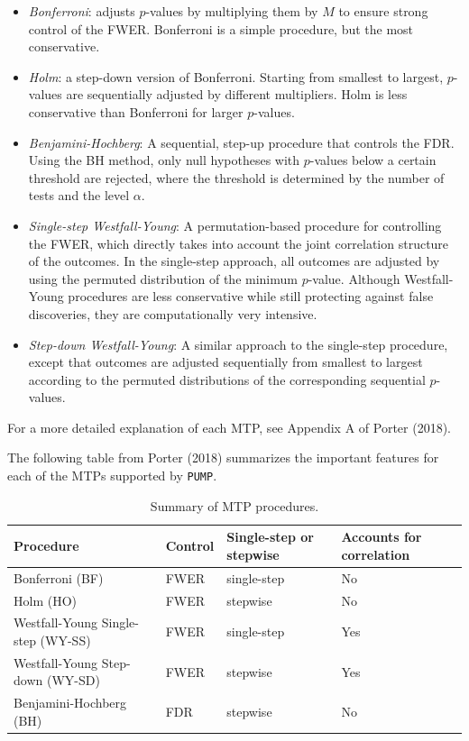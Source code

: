 \documentclass[
]{article}
\providecommand{\tightlist}{%
  \setlength{\itemsep}{0pt}\setlength{\parskip}{0pt}}
\begin{document}
\begin{itemize}
\tightlist
\item
  \emph{Bonferroni}: adjusts \(p\)-values by multiplying them by \(M\)
  to ensure strong control of the FWER. Bonferroni is a simple
  procedure, but the most conservative.
\item
  \emph{Holm}: a step-down version of Bonferroni. Starting from smallest
  to largest, \(p\)-values are sequentially adjusted by different
  multipliers. Holm is less conservative than Bonferroni for larger
  \(p\)-values.
\item
  \emph{Benjamini-Hochberg}: A sequential, step-up procedure that
  controls the FDR. Using the BH method, only null hypotheses with
  \(p\)-values below a certain threshold are rejected, where the
  threshold is determined by the number of tests and the level
  \(\alpha\).
\item
  \emph{Single-step Westfall-Young}: A permutation-based procedure for
  controlling the FWER, which directly takes into account the joint
  correlation structure of the outcomes. In the single-step approach,
  all outcomes are adjusted by using the permuted distribution of the
  minimum \(p\)-value. Although Westfall-Young procedures are less
  conservative while still protecting against false discoveries, they
  are computationally very intensive.
\item
  \emph{Step-down Westfall-Young}: A similar approach to the single-step
  procedure, except that outcomes are adjusted sequentially from
  smallest to largest according to the permuted distributions of the
  corresponding sequential \(p\)-values.
\end{itemize}

For a more detailed explanation of each MTP, see Appendix A of Porter
(2018).

The following table from Porter (2018) summarizes the important features
for each of the MTPs supported by \texttt{PUMP}.

\begin{table}[h!]
\centering
\begin{tabular}{l l l l}
Procedure                             & Control & Single-step or stepwise & Accounts for correlation \\ \hline
Bonferroni (BF)                       & FWER    & single-step             & No                       \\
Holm (HO)                             & FWER    & stepwise                & No\\
Westfall-Young Single-step (WY-SS)    & FWER    & single-step             & Yes\\
Westfall-Young Step-down (WY-SD)      & FWER    & stepwise                & Yes\\
Benjamini-Hochberg (BH)               & FDR     & stepwise                & No
\end{tabular}
\caption{Summary of MTP procedures.}
  \label{tab:mtp}
\end{table}
\end{document}
